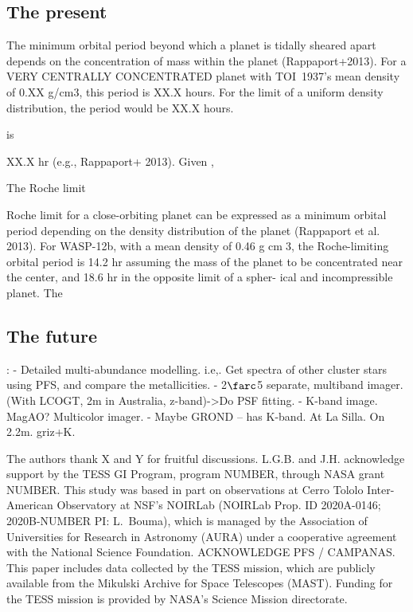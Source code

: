 \documentclass[12pt,twocolumn,tighten]{aastex63}
\newcommand{\tn}{TOI~1937} %
\begin{document}
\subsection{The present}

The minimum orbital period beyond which a planet is tidally sheared
apart depends on the concentration of mass within the planet
(Rappaport+2013).
For a VERY CENTRALLY CONCENTRATED planet with \tn's
mean density of 0.XX g/cm3, this period is XX.X hours.
For the limit of a uniform density distribution, the period would be
XX.X hours.

is 

XX.X hr (e.g., Rappaport+ 2013).
Given ,


The Roche limit 

Roche limit for a close-orbiting planet can
be expressed as a minimum orbital period depending
on the density distribution of the planet (Rappaport
et al. 2013). For WASP-12b, with a mean density of
0.46 g cm􀀀3, the Roche-limiting orbital period is 14.2 hr
assuming the mass of the planet to be concentrated near
the center, and 18.6 hr in the opposite limit of a spher-
ical and incompressible planet. The

\subsection{The future}:
- Detailed multi-abundance modelling.
  i.e,. Get spectra of other cluster stars using PFS, and compare the metallicities.
- 2$\farc$5 separate, multiband imager. (With LCOGT, 2m in Australia,
  z-band)->Do PSF fitting.
- K-band image. MagAO? Multicolor imager.
- Maybe GROND -- has K-band. At La Silla. On 2.2m.  griz+K.




\acknowledgements
\raggedbottom

The authors thank X and Y for fruitful discussions.
%
L.G.B. and J.H. acknowledge support by the TESS GI Program, program
NUMBER, through NASA grant NUMBER.
%
This study was based in part on observations at Cerro Tololo
Inter-American Observatory at NSF's NOIRLab (NOIRLab Prop. ID
2020A-0146; 2020B-NUMBER PI: L{.}~Bouma), which is managed by the
Association of Universities for Research in Astronomy (AURA) under a
cooperative agreement with the National Science Foundation.
%
ACKNOWLEDGE PFS / CAMPANAS.
%
This paper includes data collected by the TESS mission, which are
publicly available from the Mikulski Archive for Space Telescopes
(MAST).
%
Funding for the TESS mission is provided by NASA's Science Mission
directorate.
%
\end{document}
